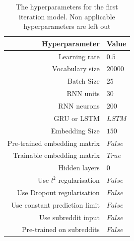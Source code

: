 \begin{table}[h!]
    \centering
    \begin{tabular}{ r  l }
        \textbf{Hyperparameter}  &  \textbf{Value} \\ \hline \hline
        Learning rate & $0.5$  \\ \hline
        Vocabulary size & $20000$ \\ \hline
        Batch Size & $25$ \\ \hline
        RNN units & $30$  \\ \hline
        RNN neurons & $200$ \\ \hline
        GRU or LSTM & $LSTM$ \\ \hline
        Embedding Size & $150$ \\ \hline
        Pre-trained embedding matrix & $False$ \\ \hline
        Trainable embedding matrix & $True$ \\ \hline
        Hidden layers & $0$ \\ \hline
        Use $l^2$ regularisation & $False$ \\ \hline
        Use Dropout regularisation & $False$ \\ \hline
        Use constant prediction limit & $False$ \\ \hline
        Use subreddit input & $False$ \\ \hline
        Pre-trained on subreddits & $False$ \\ \hline
    \end{tabular}
    \caption{The hyperparameters for the first iteration model. Non applicable hyperparameters are left out}
    \label{table:first_iter_parameters}
\end{table}

